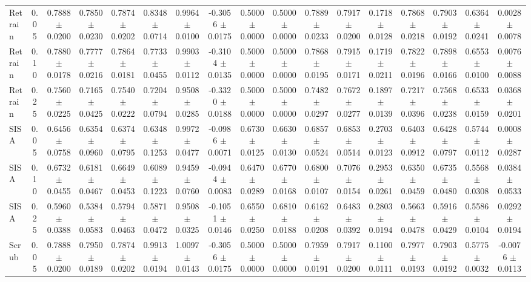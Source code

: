 \begin{table}[t]
\begin{tabular}{lcccccccccccccccc}
\midrule
Retrain & 0.05 & 0.7888 $\pm$ 0.0200 & 0.7850 $\pm$ 0.0230 & 0.7874 $\pm$ 0.0202 & 0.8348 $\pm$ 0.0714 & 0.9964 $\pm$ 0.0100 & -0.3056 $\pm$ 0.0175 & 0.5000 $\pm$ 0.0000 & 0.5000 $\pm$ 0.0000 & 0.7889 $\pm$ 0.0233 & 0.7917 $\pm$ 0.0200 & 0.1718 $\pm$ 0.0128 & 0.7868 $\pm$ 0.0218 & 0.7903 $\pm$ 0.0192 & 0.6364 $\pm$ 0.0241 & 0.0028 $\pm$ 0.0078 \\
Retrain & 0.10 & 0.7880 $\pm$ 0.0178 & 0.7777 $\pm$ 0.0216 & 0.7864 $\pm$ 0.0181 & 0.7733 $\pm$ 0.0455 & 0.9903 $\pm$ 0.0112 & -0.3104 $\pm$ 0.0135 & 0.5000 $\pm$ 0.0000 & 0.5000 $\pm$ 0.0000 & 0.7868 $\pm$ 0.0195 & 0.7915 $\pm$ 0.0171 & 0.1719 $\pm$ 0.0211 & 0.7822 $\pm$ 0.0196 & 0.7898 $\pm$ 0.0166 & 0.6553 $\pm$ 0.0100 & 0.0076 $\pm$ 0.0088 \\
Retrain & 0.25 & 0.7560 $\pm$ 0.0225 & 0.7165 $\pm$ 0.0425 & 0.7540 $\pm$ 0.0222 & 0.7204 $\pm$ 0.0794 & 0.9508 $\pm$ 0.0285 & -0.3320 $\pm$ 0.0188 & 0.5000 $\pm$ 0.0000 & 0.5000 $\pm$ 0.0000 & 0.7482 $\pm$ 0.0297 & 0.7672 $\pm$ 0.0277 & 0.1897 $\pm$ 0.0139 & 0.7217 $\pm$ 0.0396 & 0.7568 $\pm$ 0.0238 & 0.6533 $\pm$ 0.0159 & 0.0368 $\pm$ 0.0201 \\
SISA & 0.05 & 0.6456 $\pm$ 0.0758 & 0.6354 $\pm$ 0.0960 & 0.6374 $\pm$ 0.0795 & 0.6348 $\pm$ 0.1253 & 0.9972 $\pm$ 0.0477 & -0.0986 $\pm$ 0.0071 & 0.6730 $\pm$ 0.0125 & 0.6630 $\pm$ 0.0130 & 0.6857 $\pm$ 0.0524 & 0.6853 $\pm$ 0.0514 & 0.2703 $\pm$ 0.0123 & 0.6403 $\pm$ 0.0912 & 0.6428 $\pm$ 0.0797 & 0.5744 $\pm$ 0.0112 & 0.0008 $\pm$ 0.0287 \\
SISA & 0.10 & 0.6732 $\pm$ 0.0455 & 0.6181 $\pm$ 0.0467 & 0.6649 $\pm$ 0.0453 & 0.6089 $\pm$ 0.1223 & 0.9459 $\pm$ 0.0760 & -0.0944 $\pm$ 0.0083 & 0.6470 $\pm$ 0.0289 & 0.6770 $\pm$ 0.0168 & 0.6800 $\pm$ 0.0107 & 0.7076 $\pm$ 0.0154 & 0.2953 $\pm$ 0.0261 & 0.6350 $\pm$ 0.0459 & 0.6735 $\pm$ 0.0480 & 0.5568 $\pm$ 0.0308 & 0.0384 $\pm$ 0.0533 \\
SISA & 0.25 & 0.5960 $\pm$ 0.0388 & 0.5384 $\pm$ 0.0583 & 0.5794 $\pm$ 0.0463 & 0.5871 $\pm$ 0.0472 & 0.9508 $\pm$ 0.0325 & -0.1051 $\pm$ 0.0146 & 0.6550 $\pm$ 0.0250 & 0.6810 $\pm$ 0.0188 & 0.6162 $\pm$ 0.0208 & 0.6483 $\pm$ 0.0392 & 0.2803 $\pm$ 0.0194 & 0.5663 $\pm$ 0.0478 & 0.5916 $\pm$ 0.0429 & 0.5586 $\pm$ 0.0104 & 0.0292 $\pm$ 0.0194 \\
Scrub & 0.05 & 0.7888 $\pm$ 0.0200 & 0.7950 $\pm$ 0.0189 & 0.7874 $\pm$ 0.0202 & 0.9913 $\pm$ 0.0194 & 1.0097 $\pm$ 0.0143 & -0.3056 $\pm$ 0.0175 & 0.5000 $\pm$ 0.0000 & 0.5000 $\pm$ 0.0000 & 0.7959 $\pm$ 0.0191 & 0.7917 $\pm$ 0.0200 & 0.1100 $\pm$ 0.0111 & 0.7977 $\pm$ 0.0193 & 0.7903 $\pm$ 0.0192 & 0.5775 $\pm$ 0.0032 & -0.0076 $\pm$ 0.0113 \\

\end{tabular}
\end{table}
